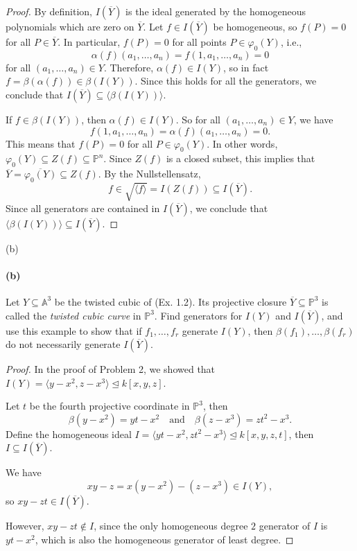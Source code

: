 \documentclass[12pt]{article}
\newlength{\myparskip}
\newenvironment{fullbox}{\begin{lrbox}{\savefullbox}\begin{minipage}{\dimexpr\textwidth-2\fboxsep\relax}\setlength{\parskip}{\myparskip}}{\end{minipage}\end{lrbox}\framebox[\textwidth]{\usebox{\savefullbox}}}
\newenvironment{pbox}[1][]{\begin{fullbox}\ifx#1\empty\else\paragraph{#1}\fi}{\end{fullbox}}
\newcommand{\isp}[1]{\quad\text{#1}\quad}
\renewcommand{\phi}{\varphi}
\newcommand{\<}{\langle}
\renewcommand{\>}{\rangle}
\newcommand{\clo}{\overline}
\newcommand{\teq}{\trianglelefteq}
\newcommand{\A}{\mathbb{A}}
\renewcommand{\P}{\mathbb{P}}
\newcommand{\rad}{\sqrt}
\begin{document}
\begin{proof}
    By definition, $I(\clo{Y})$ is the ideal generated by the homogeneous polynomials which are zero on $\clo{Y}$. Let $f \in I(\clo{Y})$ be homogeneous, so $f(P) = 0$ for all $P \in \clo{Y}$. In particular, $f(P) = 0$ for all points $P \in \phi_0(Y)$, i.e.,
    \[
        \alpha(f)(a_1, \dots, a_n) = f(1, a_1, \dots, a_n) = 0
    \]
    for all $(a_1, \dots, a_n) \in Y$. Therefore, $\alpha(f) \in I(Y)$, so in fact $f = \beta(\alpha(f)) \in \beta(I(Y))$. Since this holds for all the generators, we conclude that $I(\clo{Y}) \subseteq \<\beta(I(Y))\>$.

    If $f \in \beta(I(Y))$, then $\alpha(f) \in I(Y)$. So for all $(a_1, \dots, a_n) \in Y$, we have
    \[
        f(1, a_1, \dots, a_n) = \alpha(f)(a_1, \dots, a_n) = 0.
    \]
    This means that $f(P) = 0$ for all $P \in \phi_0(Y)$. In other words, $\phi_0(Y) \subseteq Z(f) \subseteq \P^n$. Since $Z(f)$ is a closed subset, this implies that $\clo{Y} = \clo{\phi_0(Y)} \subseteq Z(f)$. By the Nullstellensatz,
    \[
        f \in \rad{\<f\>} = I(Z(f)) \subseteq I(\clo{Y}).
    \]
    Since all generators are contained in $I(\clo{Y})$, we conclude that $\<\beta(I(Y))\> \subseteq I(\clo{Y})$.
    
\end{proof}

\begin{pbox}[(b)]
    Let $Y \subseteq \A^3$ be the twisted cubic of (Ex. 1.2). Its projective closure $\clo{Y} \subseteq \P^3$ is called the \textit{twisted cubic curve} in $\P^3$. Find generators for $I(Y)$ and $I(\clo{Y})$, and use this example to show that if $f_1, \dots, f_r$ generate $I(Y)$, then $\beta(f_1), \dots, \beta(f_r)$ do not necessarily generate $I(\clo{Y})$.
\end{pbox}

\begin{proof}
    In the proof of Problem 2, we showed that $I(Y) = \<y - x^2, z - x^3\> \teq k[x, y, z]$.

    Let $t$ be the fourth projective coordinate in $\P^3$, then
    \[
        \beta(y - x^2) = yt - x^2
        \isp{and}
        \beta(z - x^3) = zt^2 - x^3.
    \]
    Define the homogeneous ideal $I = \<yt - x^2, zt^2 - x^3\> \teq k[x, y, z, t]$, then $I \subseteq I(\clo{Y})$.

    We have
    \[
        xy - z = x(y - x^2) - (z - x^3) \in I(Y),
    \]
    so $xy - zt \in I(\clo{Y})$.

    However, $xy - zt \notin I$, since the only homogeneous degree $2$ generator of $I$ is $yt - x^2$, which is also the homogeneous generator of least degree.
    
\end{proof}
\end{document}
